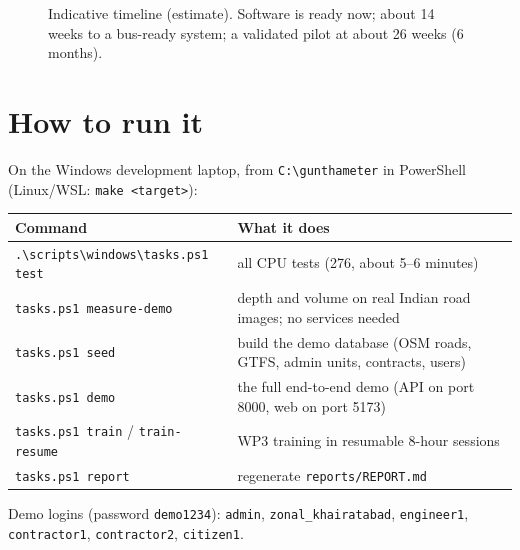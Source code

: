\documentclass[11pt,a4paper]{article}
\newcommand{\code}[1]{\texttt{\small #1}}
\newcommand{\gbar}[5]{\fill[#5] (#1,-#3+0.32) rectangle (#2,-#3-0.32);
  \node[anchor=east,font=\scriptsize] at (-0.3,-#3) {#4};}
\begin{document}
\begin{figure}[h]
\centering
{}
\caption{Indicative timeline (estimate). Software is ready now; about 14 weeks to a bus-ready system; a validated pilot
at about 26 weeks (6 months).}
\end{figure}

\section{How to run it}\label{sec:run}

On the Windows development laptop, from \code{C:\textbackslash gunthameter} in PowerShell (Linux/WSL: \code{make
<target>}):

\begin{center}
\begin{tabularx}{\textwidth}{@{}l X@{}}
\toprule
\textbf{Command} & \textbf{What it does}\\
\midrule
\code{.\textbackslash scripts\textbackslash windows\textbackslash tasks.ps1 test} & all CPU tests (276, about 5--6 minutes)\\
\code{tasks.ps1 measure-demo} & depth and volume on real Indian road images; no services needed\\
\code{tasks.ps1 seed} & build the demo database (OSM roads, GTFS, admin units, contracts, users)\\
\code{tasks.ps1 demo} & the full end-to-end demo (API on port 8000, web on port 5173)\\
\code{tasks.ps1 train} / \code{train-resume} & WP3 training in resumable 8-hour sessions\\
\code{tasks.ps1 report} & regenerate \code{reports/REPORT.md}\\
\bottomrule
\end{tabularx}
\end{center}
Demo logins (password \code{demo1234}): \code{admin}, \code{zonal\_khairatabad}, \code{engineer1},
\code{contractor1}, \code{contractor2}, \code{citizen1}.
\end{document}
